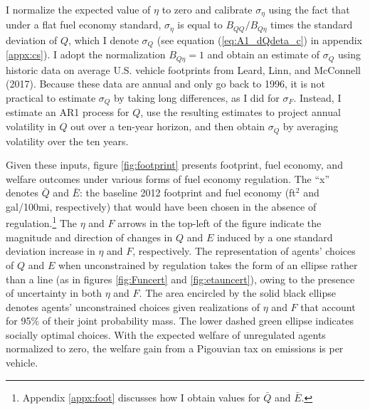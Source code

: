 \documentclass[12pt]{article}
\begin{document}
I normalize the expected value of $\eta$ to zero and calibrate $\sigma_{\eta}$ using the fact that under a flat fuel economy standard, $\sigma_{\eta}$ is equal to $B_{QQ}/B_{Q\eta}$ times the standard deviation of $Q$, which I denote $\sigma_Q$ (see equation (\ref{eq:A1_dQdeta_c}) in appendix \ref{appx:cs}). I adopt the normalization $B_{Q\eta}=1$ and obtain an estimate of $\sigma_Q$ using historic data on average U.S. vehicle footprints from Leard, Linn, and McConnell (2017). Because these data are annual and only go back to 1996, it is not practical to estimate $\sigma_Q$ by taking long differences, as I did for $\sigma_F$. Instead, I estimate an AR1 process for $Q$, use the resulting estimates to project annual volatility in $Q$ out over a ten-year horizon, and then obtain $\sigma_Q$ by averaging volatility over the ten years. 

Given these inputs, figure \ref{fig:footprint} presents footprint, fuel economy, and welfare outcomes under various forms of fuel economy regulation. The ``x'' denotes $\bar{Q}$ and $\bar{E}$:  the baseline 2012 footprint and fuel economy (ft$^2$ and gal/100mi, respectively) that would have been chosen in the absence of regulation.\footnote{Appendix \ref{appx:foot} discusses how I obtain values for $\bar{Q}$ and $\bar{E}$.} The $\eta$ and $F$ arrows in the top-left of the figure indicate the magnitude and direction of changes in $Q$ and $E$ induced by a one standard deviation increase in $\eta$ and $F$, respectively. The representation of agents' choices of $Q$ and $E$ when unconstrained by regulation takes the form of an ellipse rather than a line (as in figures \ref{fig:Funcert} and \ref{fig:etauncert}), owing to the presence of uncertainty in both $\eta$ and $F$. The area encircled by the solid black ellipse denotes agents' unconstrained choices given realizations of $\eta$ and $F$ that account for 95\% of their joint probability mass. The lower dashed green ellipse indicates socially optimal choices. With the expected welfare of unregulated agents normalized to zero, the welfare gain from a Pigouvian tax on emissions is per vehicle. 
\end{document}
